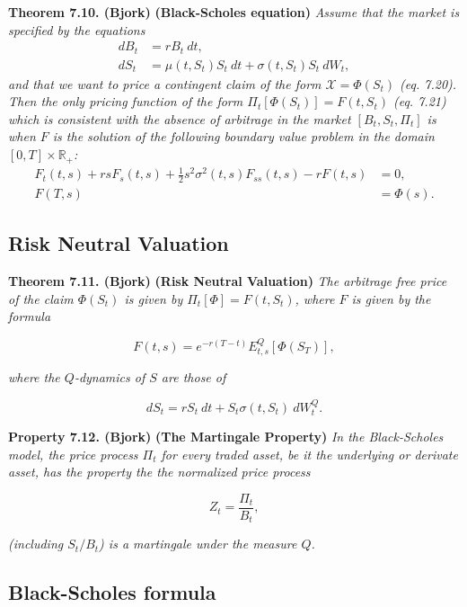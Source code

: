 \documentclass[
]{book}
\begin{document}
\textbf{Theorem 7.10. (Bjork)} \textbf{(Black-Scholes equation)} \emph{Assume that the market is specified by the equations}
\begin{align*}
dB_t&=rB_t\ dt,\tag{7.18}\\
dS_t&=\mu(t,S_t) S_t\ dt+\sigma(t,S_t)S_t\ dW_t,\tag{7.19}
\end{align*}
\emph{and that we want to price a contingent claim of the form \(\mathcal{X}=\Phi(S_t)\) (eq. 7.20). Then the only pricing function of the form \(\Pi_t[\Phi(S_t)]=F(t,S_t)\) (eq. 7.21) which is consistent with the absence of arbitrage in the market \([B_t,S_t,\Pi_t]\) is when \(F\) is the solution of the following boundary value problem in the domain \([0,T]\times\mathbb{R}_+\):}
\begin{align*}
F_t(t,s)+rsF_s(t,s)+\frac{1}{2}s^2\sigma^2(t,s)F_{ss}(t,s)-rF(t,s)&=0,\\
F(T,s)&=\Phi(s).
\end{align*}

\hypertarget{risk-neutral-valuation-1}{%
\subsection{Risk Neutral Valuation}\label{risk-neutral-valuation-1}}

\textbf{Theorem 7.11. (Bjork)} \textbf{(Risk Neutral Valuation)} \emph{The arbitrage free price of the claim \(\Phi(S_t)\) is given by \(\Pi_t[\Phi]=F(t,S_t)\), where \(F\) is given by the formula}

\[
F(t,s)=e^{-r(T-t)}E^Q_{t,s}[\Phi(S_T)],\tag{7.43}
\]

\emph{where the \(Q\)-dynamics of \(S\) are those of}

\[
dS_t=rS_t\ dt+S_t\sigma(t,S_t)\ dW_t^Q.\tag{7.42}
\]

\textbf{Property 7.12. (Bjork)} \textbf{(The Martingale Property)} \emph{In the Black-Scholes model, the price process \(\Pi_t\) for every traded asset, be it the underlying or derivate asset, has the property the the normalized price process}

\[
Z_t=\frac{\Pi_t}{B_t},
\]

\emph{(including \(S_t/B_t\)) is a martingale under the measure \(Q\).}

\hypertarget{black-scholes-formula}{%
\subsection{Black-Scholes formula}\label{black-scholes-formula}}
\end{document}
